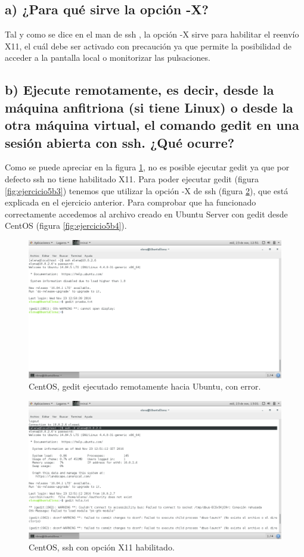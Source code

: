 \subsection{a) ¿Para qué sirve la opción -X? }
Tal y como se dice en el man de ssh \cite{sshX}, la opción -X sirve para habilitar el reenvío X11, el cuál debe ser activado con precaución ya que permite la posibilidad de acceder a la pantalla local o monitorizar las pulsaciones.

\subsection{b) Ejecute remotamente, es decir, desde la máquina anfitriona (si tiene Linux) o desde la otra máquina virtual, el comando gedit en una sesión abierta con ssh. ¿Qué ocurre?}

Como se puede apreciar en la figura \ref{fig:ejercicio5b}, no es posible ejecutar gedit ya que por defecto ssh no tiene habilitado X11. Para poder ejecutar gedit (figura \ref{fig:ejercicio5b3}) tenemos que utilizar la opción -X de ssh (figura \ref{fig:ejercicio5b2}), que está explicada en el ejercicio anterior. Para comprobar que ha funcionado correctamente accedemos al archivo creado en Ubuntu Server con gedit desde CentOS (figura \ref{fig:ejercicio5b4}).

\begin{figure}[H] 
	\centering
	\includegraphics[width=15cm]{./img/ejercicio5b.png} 	
	\caption{CentOS, gedit ejecutado remotamente hacia Ubuntu, con error.} \label{fig:ejercicio5b}
\end{figure}

\begin{figure}[H] 
	\centering
	\includegraphics[width=15cm]{./img/ejercicio5b2.png} 	
	\caption{CentOS, ssh con opción X11 habilitado.} \label{fig:ejercicio5b2}
\end{figure}


